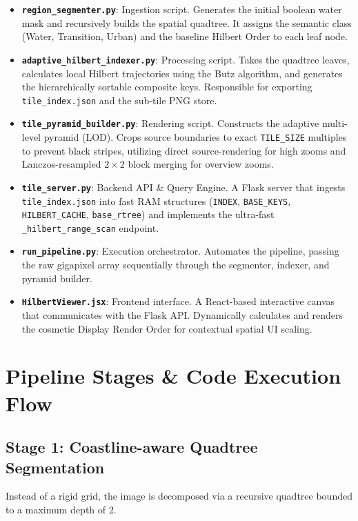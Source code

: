 \documentclass[12pt,a4paper]{article}
\begin{document}
\begin{itemize}
    \item \textbf{\texttt{region\_segmenter.py}}: Ingestion script. Generates the initial boolean water mask and recursively builds the spatial quadtree. It assigns the semantic class (Water, Transition, Urban) and the baseline Hilbert Order to each leaf node.
    \item \textbf{\texttt{adaptive\_hilbert\_indexer.py}}: Processing script. Takes the quadtree leaves, calculates local Hilbert trajectories using the Butz algorithm, and generates the hierarchically sortable composite keys. Responsible for exporting \texttt{tile\_index.json} and the sub-tile PNG store.
    \item \textbf{\texttt{tile\_pyramid\_builder.py}}: Rendering script. Constructs the adaptive multi-level pyramid (LOD). Crops source boundaries to exact \texttt{TILE\_SIZE} multiples to prevent black stripes, utilizing direct source-rendering for high zooms and Lanczos-resampled $2\times2$ block merging for overview zooms.
    \item \textbf{\texttt{tile\_server.py}}: Backend API \& Query Engine. A Flask server that ingests \texttt{tile\_index.json} into fast RAM structures (\texttt{INDEX}, \texttt{BASE\_KEYS}, \texttt{HILBERT\_CACHE}, \texttt{base\_rtree}) and implements the ultra-fast \texttt{\_hilbert\_range\_scan} endpoint.
    \item \textbf{\texttt{run\_pipeline.py}}: Execution orchestrator. Automates the pipeline, passing the raw gigapixel array sequentially through the segmenter, indexer, and pyramid builder.
    \item \textbf{\texttt{HilbertViewer.jsx}}: Frontend interface. A React-based interactive canvas that communicates with the Flask API. Dynamically calculates and renders the cosmetic Display Render Order for contextual spatial UI scaling.
\end{itemize}

\section{Pipeline Stages \& Code Execution Flow}

\subsection{Stage 1: Coastline-aware Quadtree Segmentation}
Instead of a rigid grid, the image is decomposed via a recursive quadtree bounded to a maximum depth of 2.
\end{document}
